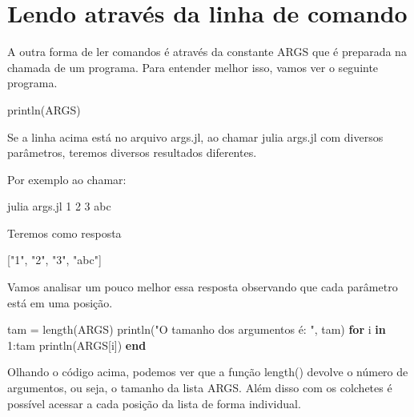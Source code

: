 \documentclass[
  letterpaper,
  DIV=11,
  numbers=noendperiod]{scrreprt}
\newenvironment{Shaded}{\begin{snugshade}}{\end{snugshade}}
\newcommand{\ConstantTok}[1]{\textcolor[rgb]{0.56,0.35,0.01}{#1}}
\newcommand{\ControlFlowTok}[1]{\textcolor[rgb]{0.00,0.23,0.31}{\textbf{#1}}}
\newcommand{\FloatTok}[1]{\textcolor[rgb]{0.68,0.00,0.00}{#1}}
\newcommand{\FunctionTok}[1]{\textcolor[rgb]{0.28,0.35,0.67}{#1}}
\newcommand{\KeywordTok}[1]{\textcolor[rgb]{0.00,0.23,0.31}{\textbf{#1}}}
\newcommand{\NormalTok}[1]{\textcolor[rgb]{0.00,0.23,0.31}{#1}}
\newcommand{\OperatorTok}[1]{\textcolor[rgb]{0.37,0.37,0.37}{#1}}
\newcommand{\StringTok}[1]{\textcolor[rgb]{0.13,0.47,0.30}{#1}}
\begin{document}
\section{Lendo através da linha de
comando}\label{lendo-atravuxe9s-da-linha-de-comando}

A outra forma de ler comandos é através da constante ARGS que é
preparada na chamada de um programa. Para entender melhor isso, vamos
ver o seguinte programa.

\begin{Shaded}
\begin{Highlighting}[]
\FunctionTok{println}\NormalTok{(}\ConstantTok{ARGS}\NormalTok{)}
\end{Highlighting}
\end{Shaded}

Se a linha acima está no arquivo args.jl, ao chamar julia args.jl com
diversos parâmetros, teremos diversos resultados diferentes.

Por exemplo ao chamar:

julia args.jl 1 2 3 abc

Teremos como resposta

\begin{Shaded}
\begin{Highlighting}[]
\NormalTok{[}\StringTok{"1"}\NormalTok{, }\StringTok{"2"}\NormalTok{, }\StringTok{"3"}\NormalTok{, }\StringTok{"abc"}\NormalTok{]}
\end{Highlighting}
\end{Shaded}

Vamos analisar um pouco melhor essa resposta observando que cada
parâmetro está em uma posição.

\begin{Shaded}
\begin{Highlighting}[]
\NormalTok{tam }\OperatorTok{=} \FunctionTok{length}\NormalTok{(}\ConstantTok{ARGS}\NormalTok{)}
\FunctionTok{println}\NormalTok{(}\StringTok{"O tamanho dos argumentos é: "}\NormalTok{, tam)}
\ControlFlowTok{for}\NormalTok{ i }\KeywordTok{in} \FloatTok{1}\OperatorTok{:}\NormalTok{tam}
    \FunctionTok{println}\NormalTok{(}\ConstantTok{ARGS}\NormalTok{[i])}
\ControlFlowTok{end}
\end{Highlighting}
\end{Shaded}

Olhando o código acima, podemos ver que a função length() devolve o
número de argumentos, ou seja, o tamanho da lista ARGS. Além disso com
os colchetes é possível acessar a cada posição da lista de forma
individual.
\end{document}
